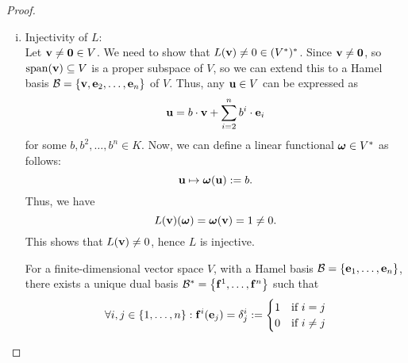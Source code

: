 \begin{proof}
\begin{enumerate}[(i)]
        \item \textsf{Injectivity of \(L\)}:\\
              Let \(\vb{v} \ne \vb{0} \in V\). We need to show that \(L(\vb{v}) \ne 0 \in (V^*)^*\). Since \(\vb{v} \ne \vb{0}\), so \(\operatorname{span}(\vb{v}) \subseteq V\) is a proper subspace of \(V\), so we can extend this to a Hamel basis \(\mathcal B = \qty{\vb{v}, \vb{e}_2, \ldots, \vb{e}_n}\) of \(V\). Thus, any \(\vb{u} \in V\) can be expressed as
              \begin{equation}
                  \vb{u} = b \cdot \vb{v} + \sum_{i=2}^{n} b^i \cdot \vb{e}_i
              \end{equation}
              for some \(b, b^2, \ldots, b^n \in K\). Now, we can define a linear functional \(\vb*{\omega} \in V^*\) as follows:
              \begin{equation}
                  \vb{u} \mapsto \vb*{\omega}(\vb{u}) := b.
              \end{equation}
              Thus, we have
              \begin{equation}
                  L(\vb{v})(\vb*{\omega}) = \vb*{\omega}(\vb{v}) = 1 \ne 0.
              \end{equation}
              This shows that \(L(\vb{v}) \ne 0\), hence \(L\) is injective.

              \begin{claim}
                  For a finite-dimensional vector space \(V\), with a Hamel basis \(\mathcal B = \qty{\vb{e}_1, \ldots, \vb{e}_n}\), there exists a unique dual basis \(\mathcal B^* = \qty{\vb{f}^1, \ldots, \vb{f}^n}\) such that
                  \begin{equation}
                      \forall i, j \in \qty{1, \ldots, n}: \vb{f}^i(\vb{e}_j) = \delta^{i}_j := \begin{cases}
                          1 & \text{if } i = j   \\
                          0 & \text{if } i \ne j
                      \end{cases}
                  \end{equation}
              \end{claim}


\end{enumerate}
\end{proof}
